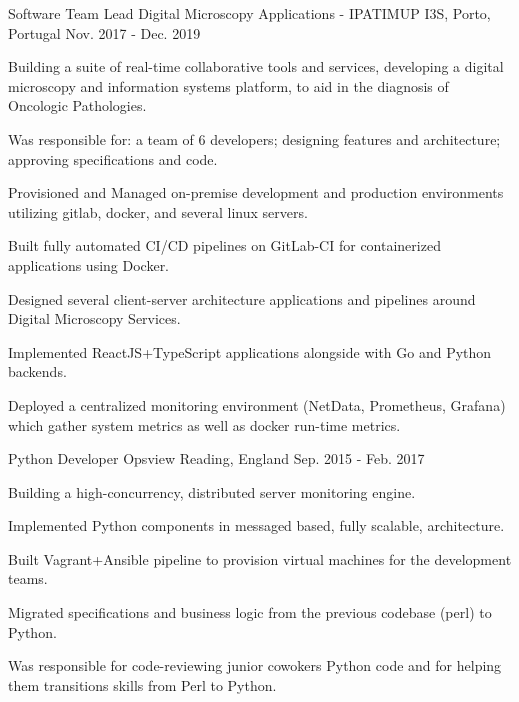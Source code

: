 

\begin{cventries}

  \cventry
    {Software Team Lead} %
    {Digital Microscopy Applications - IPATIMUP} %
    {I3S, Porto, Portugal} %
    {Nov. 2017 - Dec. 2019} %
    {
      \begin{cvitems} %
        \item {Building a suite of real-time collaborative tools and services, developing a digital microscopy and information systems platform, to aid in the diagnosis of Oncologic Pathologies. }
        \item {Was responsible for: a team of 6 developers; designing features and architecture; approving specifications and code.}
	\item {Provisioned and Managed on-premise development and production environments utilizing gitlab, docker, and several linux servers.}
        \item {Built fully automated CI/CD pipelines on GitLab-CI for containerized applications using Docker.}
        \item {Designed several client-server architecture applications and pipelines around Digital Microscopy Services.}
        \item {Implemented ReactJS+TypeScript applications alongside with Go and Python backends.}
        \item {Deployed a centralized monitoring environment (NetData, Prometheus, Grafana) which gather system metrics as well as docker run-time metrics.}
      \end{cvitems}
    }

  \cventry
    {Python Developer} %
    {Opsview} %
    {Reading, England} %
    {Sep. 2015 - Feb. 2017} %
    {
      \begin{cvitems} %
        \item {Building a high-concurrency, distributed server monitoring engine.}
        \item {Implemented Python components in messaged based, fully scalable, architecture.}
	\item {Built Vagrant+Ansible pipeline to provision virtual machines for the development teams.}
	\item {Migrated specifications and business logic from the previous codebase (perl) to Python.}
        \item {Was responsible for code-reviewing junior cowokers Python code and for helping them transitions skills from Perl to Python.}
      \end{cvitems}
    }


\end{cventries}
